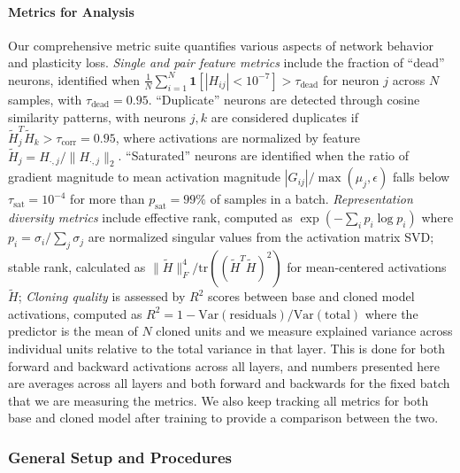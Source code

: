 \documentclass{article}
\numberwithin{figure}{section}
\begin{document}
\paragraph{Metrics for Analysis} Our comprehensive metric suite quantifies various aspects of network behavior and plasticity loss. \emph{Single and pair feature metrics} include the fraction of ``dead'' neurons, identified when $\frac{1}{N} \sum_{i=1}^{N} \mathbf{1}[|H_{ij}| < 10^{-7}] > \tau_{\text{dead}}$ for neuron $j$ across $N$ samples, with $\tau_{\text{dead}} = 0.95$. ``Duplicate'' neurons are detected through cosine similarity patterns, with neurons $j,k$ are considered duplicates if $\tilde{H}_j^T \tilde{H}_k > \tau_{\text{corr}} = 0.95$, where  activations are normalized by feature $\tilde{H}_j = H_{\cdot,j}/\|H_{\cdot,j}\|_2$. ``Saturated'' neurons are identified when the ratio of gradient magnitude to mean activation magnitude $|G_{ij}|/\max(\mu_j, \epsilon)$ falls below $\tau_{\text{sat}} = 10^{-4}$ for more than $p_{\text{sat}} = 99\%$ of samples in a batch. \emph{Representation diversity metrics} include effective rank, computed as $\exp(-\sum_i p_i \log p_i)$ where $p_i = \sigma_i/\sum_j \sigma_j$ are normalized singular values from the activation matrix SVD; stable rank, calculated as $\|\tilde{H}\|_F^4/\text{tr}((\tilde{H}^T\tilde{H})^2)$ for mean-centered activations $\tilde{H}$;  \emph{Cloning quality} is assessed by $R^2$ scores between base and cloned model activations, computed as $R^2 = 1 - \text{Var}(\text{residuals})/\text{Var}(\text{total})$ where the predictor is the mean of $N$ cloned units and we measure explained variance across individual units relative to the total variance in that layer. This is done for both forward and backward activations across all layers, and numbers presented here are averages across all layers and both forward and backwards for the fixed batch that we are measuring the metrics. We also keep tracking all metrics for both base and cloned model after training to provide a comparison between the two. 
\subsubsection{General Setup and Procedures}
\label{subsec:general_setup}
\end{document}
